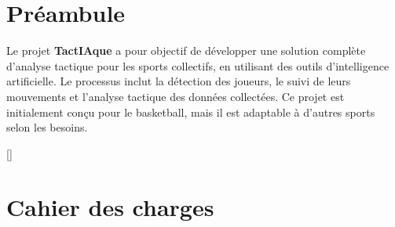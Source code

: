 \documentclass[a4paper,13pt]{book}
\newcommand\mychapter{\titleformat{\chapter}[block]{}{}{0pt}{\centering\hrule height 5pt
		\vglue-1.1 \baselineskip
		\tcbox[enhanced,colback=white,frame code={}]{\bfseries\chaptername\hskip2mm \thechapter}
		\bigskip
		\vglue-3mm\hrule \vglue3mm
		{\huge \bfseries ##1}\vglue3mm\hrule
	}[]\chapter}
\begin{document}
\tableofcontents
\chapter*{Préambule}
Le projet \textbf{TactIAque} a pour objectif de développer une solution complète d’analyse tactique pour les sports collectifs, en utilisant des outils d’intelligence artificielle. Le processus inclut la détection des joueurs, le suivi de leurs mouvements et l’analyse tactique des données collectées. Ce projet est initialement conçu pour le basketball, mais il est adaptable à d’autres sports selon les besoins.
\mychapter{Cahier des charges}
\minitoc
\newpage

\end{document}
